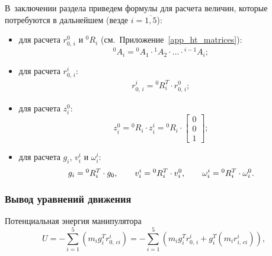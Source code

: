 В~заключении раздела приведем формулы для расчета величин, которые потребуются в дальнейшем (везде $i = \overline{1,5}$):
\begin{itemize}
    \item для расчета $r^0_{0,\,i}$ и ${}^{0}R_i$ (см.~Приложение~\ref{app_ht_matrices}):
        \begin{equation}
            {}^0A_i = {}^0A_1 \cdot {}^1A_2 \cdot \ldots \cdot {}^{i-1}A_i;
        \end{equation}
    \item для расчета $r^i_{0,\,i}$:
        \begin{gather}
            r^i_{0,\,i} = {}^{0}R_i^T \cdot r^0_{0,\,i};
        \end{gather}
    \item для расчета $z^0_i$:
        \begin{equation}
            z^0_i = {}^{0}R_i \cdot z^i_i = {}^{0}R_i \cdot
            \begin{bmatrix}
                0 \\ 0 \\ 1
            \end{bmatrix}\!\!;
        \end{equation}
    \item для расчета $g_i$, $v^i_i$ и $\omega^i_i$:
        \begin{equation}\label{eq_transform_of_g_v_omega}
            g_i = {}^{0}R_i^T \cdot g_0,
            \qquad
            v^i_i = {}^{0}R_i^T \cdot v^0_i,
            \qquad
            \omega^i_i = {}^{0}R_i^T \cdot \omega^0_i \ldotp
        \end{equation}
\end{itemize}

\subsubsection{Вывод уравнений движения}
Потенциальная энергия манипулятора
\begin{equation}
    U =  -\sum_{i=1}^5 \left( m_i g_i^T r^i_{0,\,ci} \right) = -\sum_{i=1}^5 \left( m_i g_i^T r^i_{0,\,i} + g_i^T (m_ir^i_{i,\,ci}) \right)\!,
\end{equation}


